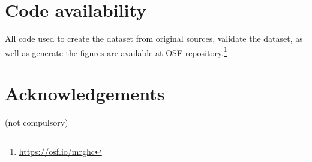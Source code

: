 \documentclass[fleqn,10pt]{wlscirep}
\begin{document}

\section*{Code availability}

All code used to create the dataset from original sources, validate the dataset, as well as generate the figures are available at OSF repository.\footnote{\url{https://osf.io/mrghc} }





\section*{Acknowledgements} (not compulsory)

\end{document}
